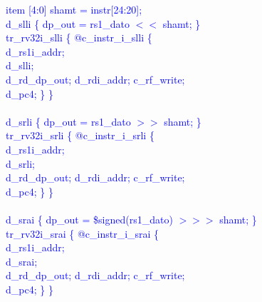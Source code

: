 \textcolor{blue}{
\indent item [4:0] shamt = instr[24:20];\\%
\indent d\_slli \{ dp\_out = rs1\_dato $<<$ shamt; \}\\%
\indent tr\_rv32i\_slli \{ @c\_instr\_i\_slli \{ \\%
\indent \hspace{\parindent} d\_rs1i\_addr; \\%
\indent \hspace{\parindent} d\_slli; \\%
\indent \hspace{\parindent} d\_rd\_dp\_out; d\_rdi\_addr; c\_rf\_write;  \\%
\indent \hspace{\parindent} d\_pc4; \} \} \\%
\\
\indent d\_srli \{ dp\_out = rs1\_dato $>>$ shamt; \}\\%
\indent tr\_rv32i\_srli \{ @c\_instr\_i\_srli \{ \\%
\indent \hspace{\parindent} d\_rs1i\_addr; \\%
\indent \hspace{\parindent} d\_srli; \\%
\indent \hspace{\parindent} d\_rd\_dp\_out; d\_rdi\_addr; c\_rf\_write;  \\%
\indent \hspace{\parindent} d\_pc4; \} \} \\%
\\
\indent d\_srai \{ dp\_out = \$signed(rs1\_dato) $>>>$ shamt; \}\\%
\indent tr\_rv32i\_srai \{ @c\_instr\_i\_srai \{ \\%
\indent \hspace{\parindent} d\_rs1i\_addr; \\%
\indent \hspace{\parindent} d\_srai; \\%
\indent \hspace{\parindent} d\_rd\_dp\_out; d\_rdi\_addr; c\_rf\_write;  \\%
\indent \hspace{\parindent} d\_pc4; \} \} \\%
}

